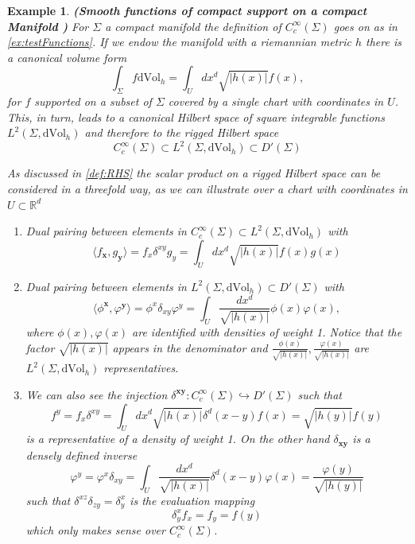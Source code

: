 \documentclass[12pt]{article}%
\newcommand{\mb}[1]{{\mathbf{#1}}}
\newtheorem{example}{Example}%
\begin{document}
\begin{example}\label{ex:testFunctionsManifold}{\bf (Smooth functions of compact support on a compact Manifold )} For $\Sigma$ a compact manifold the definition of $C^\infty_c(\Sigma)$ goes on as in \autoref{ex:testFunctions}. If we endow the manifold with a riemannian metric $h$ there is a canonical volume form 
\begin{equation}
\label{eq:riemannianVolumeform}
\int_\Sigma f\mathrm{dVol}_h=\int_U dx^d \sqrt{\lvert h(x)\rvert} f(x),
\end{equation}
for $f$ supported on a subset of $\Sigma$ covered by  a single chart with coordinates in $U$. This, in turn, leads to a canonical Hilbert space of square integrable functions $L^2(\Sigma,\mathrm{dVol}_h)$ and therefore to the rigged Hilbert space 
\begin{equation}
\label{eq:riggedOnAManifold}
C^\infty_c(\Sigma)\subset L^2(\Sigma,\mathrm{dVol}_h) \subset D'(\Sigma)
\end{equation}  
  

As discussed in \autoref{def:RHS} the scalar product on a rigged Hilbert space can be considered in a threefold way, as we can illustrate over a chart with coordinates in $U\subset \mathbb{R}^d$

\begin{enumerate}[label=\alph*)]
        \item Dual pairing between elements in $C^\infty_c(\Sigma)\subset L^2(\Sigma,\mathrm{dVol}_h)$ with $$\langle f_\mb{x} ,g_\mb{y}\rangle =f_x\delta^{xy}g_y=\int_U dx^d\sqrt{\lvert h(x)\rvert} f(x)g(x)$$
    \item Dual pairing between elements in  $L^2(\Sigma,\mathrm{dVol}_h) \subset D'(\Sigma)$ with $$\langle\phi^{\mathbf{x}} ,\varphi^{\mathbf{y}}\rangle =\phi^x\delta_{xy}\varphi^y=\int_U\frac{dx^d}{\sqrt{\lvert h(x)\rvert}} \phi(x)\varphi(x),$$
    where $\phi(x),\varphi(x)$ are identified with  densities of weight 1. Notice that the factor $\sqrt{\lvert h(x)\rvert}$ appears in the denominator and $\frac{\phi(x)}{\sqrt{\lvert h(x)\rvert}}, \frac{\varphi(x)}{\sqrt{\lvert h(x)\rvert}}$ are $L^2(\Sigma, \mathrm{dVol}_h)$ representatives.
    \item We can also see the injection ${\delta^{\mathbf{xy}}}:C^\infty_c(\Sigma) \hookrightarrow D'(\Sigma)$  such that
    $$f^y=f_x\delta^{xy}=\int_U dx^d\sqrt{\lvert h(x)\rvert}\delta^d(x-y) f(x)=\sqrt{\lvert h(y)\rvert}f(y)$$
    is a representative of a density of weight 1. On the other hand $\delta_{\mathbf{xy}}$ is a densely defined inverse 
    $$\varphi^y=\varphi^x\delta_{xy}=\int_U \frac{dx^d}{\sqrt{\lvert h(x)\rvert}}\delta^d(x-y) \varphi(x)=\frac{\varphi(y)}{\sqrt{\lvert h(y)\rvert}}$$
    such that $\delta^{xz}\delta_{zy}=\delta^x_y$ is the evaluation mapping
    $$\delta^x_yf_x=f_y=f(y)$$
    which only makes sense over $C^\infty_c(\Sigma)$.
\end{enumerate}


\end{example}
\end{document}
